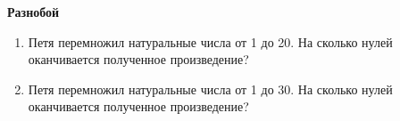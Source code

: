 \documentclass{article}
\begin{document}
\large
	
\begin{center}
	\textbf{Разнобой}
\end{center}


\begin{enumerate}[label*=\protect\fbox{\arabic{enumi}}]

\item Петя перемножил натуральные числа от 1 до 20. На сколько нулей оканчивается полученное произведение?

\item Петя перемножил натуральные числа от 1 до 30. На сколько нулей оканчивается полученное произведение?

\end{enumerate}
\end{document}
